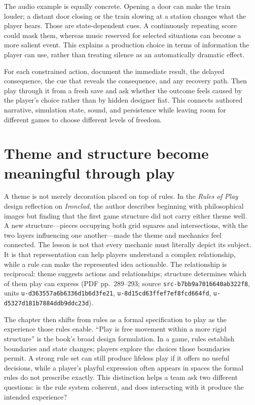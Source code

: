 The audio example is equally concrete. Opening a door can make the train louder; a distant door closing or the train slowing at a station changes what the player hears. Those are state-dependent cues. A continuously repeating score could mask them, whereas music reserved for selected situations can become a more salient event. This explains a production choice in terms of information the player can use, rather than treating silence as an automatically dramatic effect.

For each constrained action, document the immediate result, the delayed consequence, the cue that reveals the consequence, and any recovery path. Then play through it from a fresh save and ask whether the outcome feels caused by the player's choice rather than by hidden designer fiat. This connects authored narrative, simulation state, sound, and persistence while leaving room for different games to choose different levels of freedom.

\section{Theme and structure become meaningful through play}\label{06-engine-ii-ch047-theme-and-structure-become-meaningful-through-play}

A theme is not merely decoration placed on top of rules. In the \emph{Rules of Play} design reflection on \emph{Ironclad}, the author describes beginning with philosophical images but finding that the first game structure did not carry either theme well. A new structure---pieces occupying both grid squares and intersections, with the two layers influencing one another---made the theme and mechanics feel connected. The lesson is not that every mechanic must literally depict its subject. It is that representation can help players understand a complex relationship, while a rule can make the represented idea actionable. The relationship is reciprocal: theme suggests actions and relationships; structure determines which of them play can express (PDF pp.~289--293; source \texttt{src-b7bb9a7016640ab322f8}, units \texttt{u-d363557a6b6336d1b6d3fe21}, \texttt{u-8d15cd63ffef7ef8fcd664fd}, \texttt{u-d5327d181b7884ddb9ddc23d}).

The chapter then shifts from rules as a formal specification to play as the experience those rules enable. ``Play is free movement within a more rigid structure'' is the book's broad design formulation. In a game, rules establish boundaries and state changes; players explore the choices those boundaries permit. A strong rule set can still produce lifeless play if it offers no useful decisions, while a player's playful expression often appears in spaces the formal rules do not prescribe exactly. This distinction helps a team ask two different questions: is the rule system coherent, and does interacting with it produce the intended experience?

